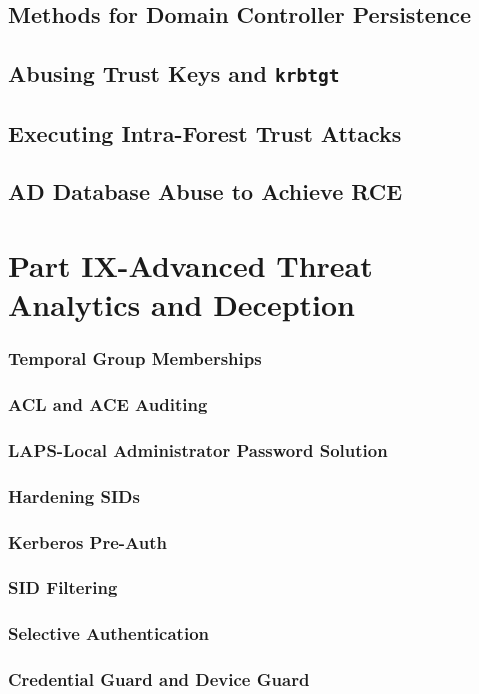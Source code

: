\documentclass{article}
\begin{document}
\subsection{Methods for Domain Controller Persistence}
\subsection{Abusing Trust Keys and \texttt{krbtgt}}
\subsection{Executing Intra-Forest Trust Attacks}
\subsection{AD Database Abuse to Achieve RCE}
\section{Part IX-Advanced Threat Analytics and Deception}
\subsubsection{Temporal Group Memberships}
\subsubsection{ACL and ACE Auditing}
\subsubsection{LAPS-Local Administrator Password Solution}
\subsubsection{Hardening SIDs}
\subsubsection{Kerberos Pre-Auth}
\subsubsection{SID Filtering}
\subsubsection{Selective Authentication}
\subsubsection{Credential Guard and Device Guard}
\end{document}
